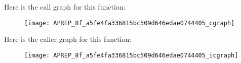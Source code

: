 Here is the call graph for this function\+:\nopagebreak
\begin{figure}[H]
\begin{center}
\leavevmode
\texttt{[image: APREP\_8f\_a5fe4fa336815bc509d646edae0744405\_cgraph]}
\end{center}
\end{figure}




Here is the caller graph for this function\+:\nopagebreak
\begin{figure}[H]
\begin{center}
\leavevmode
\texttt{[image: APREP\_8f\_a5fe4fa336815bc509d646edae0744405\_icgraph]}
\end{center}
\end{figure}


